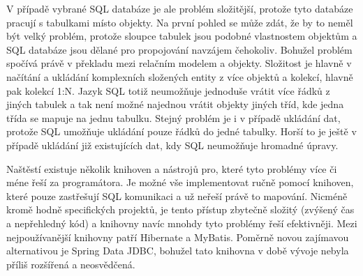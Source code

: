		V případě vybrané \ac{SQL} databáze je ale problém složitější, protože tyto databáze pracují s tabulkami místo objekty.
		Na první pohled se může zdát, že by to neměl být velký problém, protože sloupce tabulek jsou podobné vlastnostem
		objektům a \ac{SQL} databáze jsou dělané pro propojování navzájem čehokoliv.
		Bohužel problém spočívá právě v překladu mezi relačním modelem a objekty.
		Složitost je hlavně v načítání a ukládání komplexních složených entity z více objektů a kolekcí, hlavně pak
		kolekcí 1:N.
		Jazyk \ac{SQL} totiž neumožňuje jednoduše vrátit více řádků z jiných tabulek a tak není možné najednou
		vrátit objekty jiných tříd, kde jedna třída se mapuje na jednu tabulku.
		Stejný problém je i v případě ukládání dat, protože \ac{SQL} umožňuje ukládání pouze řádků do jedné tabulky.
		Horší to je ještě v případě ukládání již existujících dat, kdy \ac{SQL} neumožňuje hromadné úpravy.

		Naštěstí existuje několik knihoven a nástrojů pro, které tyto problémy více či méne řeší za programátora.
		Je možné vše implementovat ručně pomocí knihoven, které pouze zastřešují \ac{SQL} komunikaci a už neřeší
		právě to mapování.
		Nicméně kromě hodně specifických projektů, je tento přístup zbytečně složitý (zvýšený čas a nepřehledný kód)
		a knihovny navíc mnohdy tyto problémy řeší efektivněji.
		Mezi nejpoužívanější knihovny patří Hibernate a MyBatis.
		Poměrně novou zajímavou alternativou je Spring Data JDBC, bohužel tato knihovna v době vývoje nebyla příliš
		rozšířená a neosvědčená.

